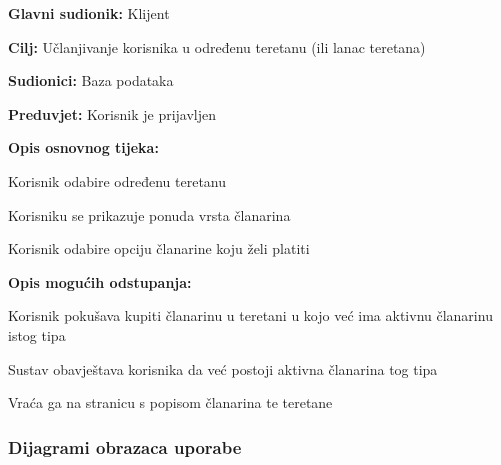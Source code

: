 					\noindent {}
					\begin{packed_item}
	
						\item \textbf{Glavni sudionik: }Klijent
						\item  \textbf{Cilj:} Učlanjivanje korisnika u određenu teretanu (ili lanac teretana)
						\item  \textbf{Sudionici:} Baza podataka
						\item  \textbf{Preduvjet:} Korisnik je prijavljen
						\item  \textbf{Opis osnovnog tijeka:}
						
						\item[] \begin{packed_enum}
	
							\item Korisnik odabire određenu teretanu
							\item Korisniku se prikazuje ponuda vrsta članarina
							\item Korisnik odabire opciju članarine koju želi platiti
						\end{packed_enum}
					
						\item  \textbf{Opis mogućih odstupanja:}
						
						\item[] \begin{packed_item}
	
							\item[3.a]
						Korisnik pokušava kupiti članarinu u teretani u kojo već ima aktivnu članarinu istog tipa
							\item[] \begin{packed_enum}
								
								\item Sustav obavještava korisnika da već postoji aktivna članarina tog tipa
								\item Vraća ga na stranicu s popisom članarina te teretane
							\end{packed_enum}
						\end{packed_item}
					\end{packed_item}
				
					
				\subsubsection{Dijagrami obrazaca uporabe}
					
